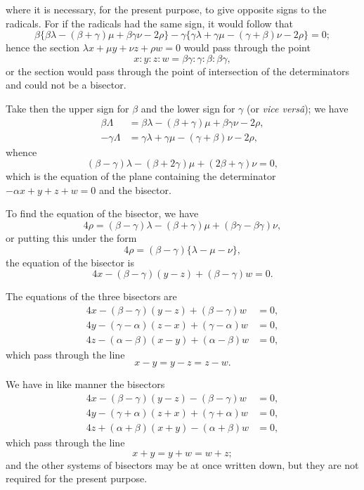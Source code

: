 \documentclass[11pt,a4paper]{book}
\begin{document}
\newpage
\setcounter{page}{62}

where it is necessary, for the present purpose, to give opposite signs to the radicals. For if the radicals had the same sign, it would follow that
\[
\beta\{\beta\lambda-(\beta+\gamma)\mu+\beta\gamma\nu-2\rho\} - \gamma\{\gamma\lambda+\gamma\mu-(\gamma+\beta)\nu-2\rho\} = 0;
\]
hence the section $\lambda x + \mu y + \nu z + \rho w = 0$ would pass through the point
\[
x:y:z:w = \beta\gamma : \gamma : \beta : \beta\gamma,
\]
or the section would pass through the point of intersection of the determinators and could not be a bisector.

Take then the upper sign for $\beta$ and the lower sign for $\gamma$ (or \textit{vice vers\^a}); we have
\begin{align*}
\beta\Lambda &= \beta\lambda - (\beta+\gamma)\mu + \beta\gamma\nu - 2\rho,\\
-\gamma\Lambda &= \gamma\lambda + \gamma\mu - (\gamma+\beta)\nu - 2\rho,
\end{align*}
whence
\[
(\beta-\gamma)\lambda - (\beta+2\gamma)\mu + (2\beta+\gamma)\nu = 0,
\]
which is the equation of the plane containing the determinator $-\alpha x+y+z+w=0$ and the bisector.

To find the equation of the bisector, we have
\[
4\rho = (\beta-\gamma)\lambda - (\beta+\gamma)\mu + (\beta\gamma-\beta\gamma)\nu,
\]
or putting this under the form
\[
4\rho = (\beta-\gamma)\{\lambda - \mu - \nu\},
\]
the equation of the bisector is
\[
4x - (\beta-\gamma)(y-z) + (\beta-\gamma)w = 0.
\]

The equations of the three bisectors are
\begin{align*}
4x - (\beta-\gamma)(y-z) + (\beta-\gamma)w &= 0,\\
4y - (\gamma-\alpha)(z-x) + (\gamma-\alpha)w &= 0,\\
4z - (\alpha-\beta)(x-y) + (\alpha-\beta)w &= 0,
\end{align*}
which pass through the line
\[
x-y = y-z = z-w.
\]

\newpage
\setcounter{page}{63}

We have in like manner the bisectors
\begin{align*}
4x - (\beta-\gamma)(y-z) - (\beta-\gamma)w &= 0,\\
4y - (\gamma+\alpha)(z+x) + (\gamma+\alpha)w &= 0,\\
4z + (\alpha+\beta)(x+y) - (\alpha+\beta)w &= 0,
\end{align*}
which pass through the line
\[
x+y = y+w = w+z;
\]
and the other systems of bisectors may be at once written down, but they are not required for the present purpose.
\end{document}
